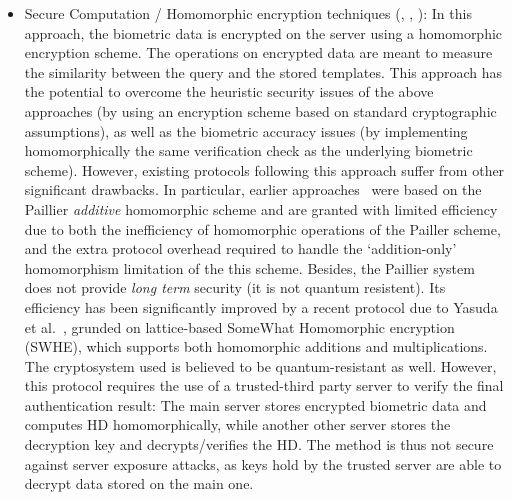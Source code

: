 \begin{itemize}
\item Secure Computation / Homomorphic encryption techniques
    (\cite{yasuda2014practical}, \cite{shahandashti2012private},
    \cite{higo2015privacy}): In this approach, the biometric data is encrypted
    on the server using a homomorphic encryption scheme. The operations on
    encrypted data are meant to measure the similarity between the query and the
    stored templates. This approach has the potential to overcome the heuristic
    security issues of the above approaches (by using an encryption scheme based
    on standard cryptographic assumptions), as well as the biometric accuracy
    issues (by implementing homomorphically the same verification check as the
    underlying biometric scheme). However, existing protocols following this
    approach suffer from other significant drawbacks. In particular, earlier
    approaches~\cite{shahandashti2012private} were based on the Paillier
    \emph{additive} homomorphic scheme and are granted with limited efficiency due to
    both the inefficiency of homomorphic operations of the Pailler scheme, and
    the extra protocol overhead required to handle the `addition-only'
    homomorphism limitation of the this scheme. Besides, the Paillier system
    does not provide \emph{long term} security (it is not quantum resistent).
    Its efficiency has been
    significantly improved by a recent protocol due to Yasuda et
    al.~\cite{yasuda2014practical}, grunded on lattice-based SomeWhat Homomorphic
    encryption (SWHE), which supports both homomorphic additions and multiplications.
    The cryptosystem used is believed to be quantum-resistant as
    well.
    However, this protocol requires the use of a trusted-third party server to
    verify the final authentication result: The main server stores encrypted
    biometric data and computes HD homomorphically, while another other server stores the
    decryption key and decrypts/verifies the HD.
    The method is thus not secure against
    server exposure attacks, as keys hold by the trusted server are able to decrypt data stored on the
    main one.
  \end{itemize}

